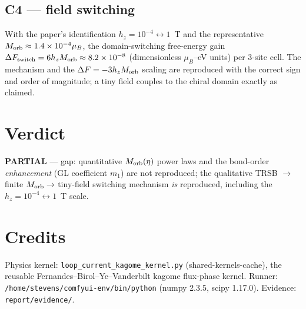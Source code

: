 \documentclass[11pt]{article}
\begin{document}
\subsection{C4 --- field switching}
With the paper's identification $h_z=10^{-4}\leftrightarrow1$~T and the
representative $M_{\rm orb}\approx1.4\times10^{-4}\mu_B$, the domain-switching
free-energy gain $\Delta F_{\rm switch}=6h_zM_{\rm orb}\approx8.2\times10^{-8}$
(dimensionless $\mu_B$--eV units) per 3-site cell. The mechanism and the
$\Delta F=-3h_zM_{\rm orb}$ scaling are reproduced with the correct sign and
order of magnitude; a tiny field couples to the chiral domain exactly as claimed.

\section{Verdict}
\textbf{PARTIAL} --- gap: quantitative $M_{\rm orb}(\eta)$ power laws and the
bond-order \emph{enhancement} (GL coefficient $m_1$) are not reproduced; the
qualitative TRSB $\to$ finite $M_{\rm orb}\to$ tiny-field switching mechanism
\emph{is} reproduced, including the $h_z=10^{-4}\leftrightarrow1$~T scale.

\section*{Credits}
Physics kernel: \texttt{loop\_current\_kagome\_kernel.py} (shared-kernels-cache),
the reusable Fernandes--Birol--Ye--Vanderbilt kagome flux-phase kernel. Runner:
\texttt{/home/stevens/comfyui-env/bin/python} (numpy 2.3.5, scipy 1.17.0).
Evidence: \texttt{report/evidence/}.
\end{document}
